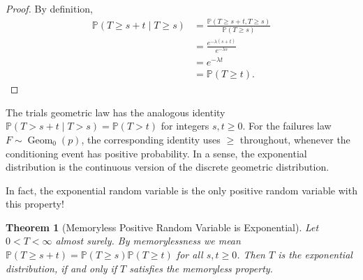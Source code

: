 \documentclass[11pt]{article}
\numberwithin{equation}{section}
\newtheorem{theorem}{Theorem}[section]
\theoremstyle{definition}
\theoremstyle{remark}
\newcommand{\pqty}[1]{\left(#1\right)}
\newcommand{\Prob}{\mathbb P}
\newcommand{\Conditional}[2]{#1\mid #2}
\newcommand{\GeomZero}{\operatorname{Geom}_0}
\begin{document}
\begin{proof}\label{probability-proof-057}
    By definition,
    \begin{align*}
        \Prob\pqty{\Conditional{T \geq s + t}{T \geq s}} &= \frac{\Prob\pqty{T \geq s + t, T \geq s}}{\Prob\pqty{T \geq s}} \\
        &= \frac{e^{-\lambda \pqty{s + t}}}{e^{-\lambda s}} \\
        &= e^{-\lambda t} \\
        &= \Prob\pqty{T \geq t}.
    \end{align*}
\end{proof}

The trials geometric law has the analogous identity \(\Prob(T>s+t\mid T>s)=\Prob(T>t)\) for integers \(s,t\ge0\). For the failures law \(F\sim\GeomZero(p)\), the corresponding identity uses \(\ge\) throughout, whenever the conditioning event has positive probability. In a sense, the exponential distribution is the continuous version of the discrete geometric distribution.

In fact, the exponential random variable is the only positive random variable with this property!

\begin{theorem}[Memoryless Positive Random Variable is Exponential]\label{probability-theorem-017}
    \label{probability-thm:memoryless-rv-is-exponential}%
    Let \(0<T<\infty\) almost surely. By memorylessness we mean \(\Prob(T\ge s+t)=\Prob(T\ge s)\Prob(T\ge t)\) for all \(s,t\ge0\). Then \(T\) is the exponential distribution, if and only if \(T\) satisfies the memoryless property.
\end{theorem}
\end{document}
